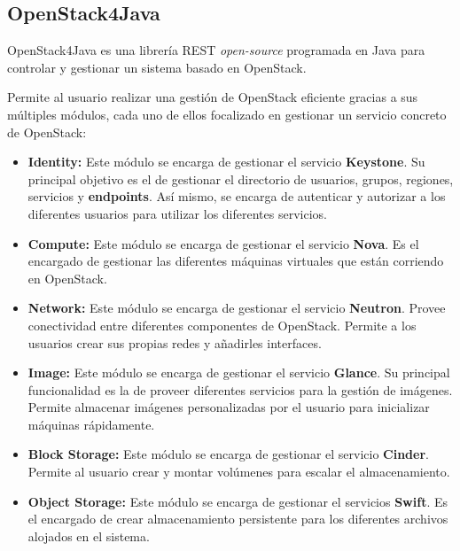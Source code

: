 \subsection{OpenStack4Java}
\label{subsec:openstack4j}

OpenStack4Java\cite{openstack4jbib} es una librería \ac{REST} \textit{open-source} programada en Java para controlar y gestionar un sistema basado en OpenStack.

Permite al usuario realizar una gestión de OpenStack eficiente gracias a sus múltiples módulos, cada uno de ellos focalizado en gestionar un servicio concreto de OpenStack:

\begin{itemize}
	\item \textbf{Identity:} Este módulo se encarga de gestionar el servicio \textbf{Keystone}. Su principal objetivo es el de gestionar el directorio de usuarios, grupos, regiones, servicios y \textbf{endpoints}. Así mismo, se encarga de autenticar y autorizar a los diferentes usuarios para utilizar los diferentes servicios.
	
	\item \textbf{Compute:} Este módulo se encarga de gestionar el servicio \textbf{Nova}. Es el encargado de gestionar las diferentes máquinas virtuales que están corriendo en OpenStack.
	
	\item \textbf{Network:} Este módulo se encarga de gestionar el servicio \textbf{Neutron}. Provee conectividad entre diferentes componentes de OpenStack. Permite a los usuarios crear sus propias redes y añadirles interfaces.
	
	\item \textbf{Image:} Este módulo se encarga de gestionar el servicio \textbf{Glance}. Su principal funcionalidad es la de proveer diferentes servicios para la gestión de imágenes. Permite almacenar imágenes personalizadas por el usuario para inicializar máquinas rápidamente.
	
	\item \textbf{Block Storage:} Este módulo se encarga de gestionar el servicio \textbf{Cinder}. Permite al usuario crear y montar volúmenes para escalar el almacenamiento.
	
	\item \textbf{Object Storage:} Este módulo se encarga de gestionar el servicios \textbf{Swift}. Es el encargado de crear almacenamiento persistente para los diferentes archivos alojados en el sistema.
\end{itemize}


